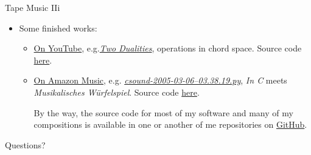 \documentclass{beamer}
\begin{document}
\begin{frame}{Tape Music IIi}

\begin{itemize}
\item Some finished works: 
\begin{itemize}
\item \href{https://www.youtube.com/@michaelgogins}{On YouTube}, e.g.\href{https://music.youtube.com/watch?v=3_ahbL44p-E&si=2ScceuKnI0Pqye5G}{\emph{Two Dualities}}, operations in chord space. Source code \href{https://github.com/gogins/cloud-5/blob/main/talks/mkg-2009-09-14-o.py}{here}.
\item \href{https://music.amazon.com/artists/B0016KQMPA/michael-gogins}{On Amazon Music}, e.g. \href{https://music.amazon.com/albums/B0016UPQRK?trackAsin=B0016UGIW2\&do=play\&ref=dm_sh_26UFIwpvtSDIIQmF2rIxH1qXC}{\emph{csound-2005-03-06--03.38.19.py}}, \emph{In C} meets \emph{Musikalisches Würfelspiel}. Source code \href{xxx}{here}.

By the way, the source code for most of my software and many of my compositions is available in one or another of me repositories on \href{https://github.com/gogins}{GitHub}.

\end{itemize}
\end{itemize}

\end{frame}

\begin{frame}{Questions?}

\end{frame}
\end{document}
